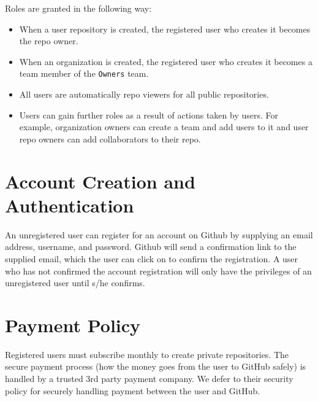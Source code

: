 \documentclass[11pt]{article}
\begin{document}
Roles are granted in the following way:
\begin{itemize}
\item When a user repository is created, the registered user who creates it becomes the repo owner.
\item When an organization is created, the registered user who creates it becomes a team member of the \texttt{Owners} team.
\item All users are automatically repo viewers for all public repositories. 
\item Users can gain further roles as a result of actions taken by users. For example, organization owners can create a team and add users to it and user repo owners can add collaborators to their repo.
\end{itemize}


\section*{Account Creation and Authentication}
An unregistered user can register for an account on Github by supplying an email address, username, and password. Github will send a confirmation link to the supplied email, which the user can click on to confirm the registration. A user who has not confirmed the account registration will only have the privileges of an unregistered user until s/he confirms.

\section*{Payment Policy}
Registered users must subscribe monthly to create private repositories. The secure payment process (how the money goes from the user to GitHub safely) is handled by a trusted 3rd party payment company. We defer to their security policy for securely handling payment between the user and GitHub.
\end{document}

